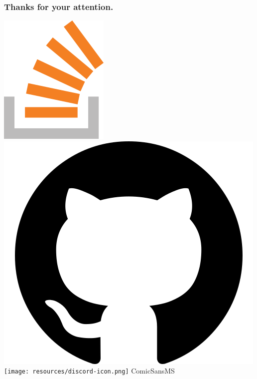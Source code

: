 \documentclass[aspectratio=169]{beamer}
\begin{document}
\begin{frame}
  \frametitle{Thanks for your attention.}

  \href{https://stackoverflow.com/users/577603/comicsansms}{\includegraphics[height=.05\textheight]{resources/so-icon.png}}
  \href{https://github.com/ComicSansMS}{\includegraphics[height=.05\textheight]{resources/github-icon.png}}
  \texttt{[image: resources/discord-icon.png]} ComicSansMS

\end{frame}
\end{document}
